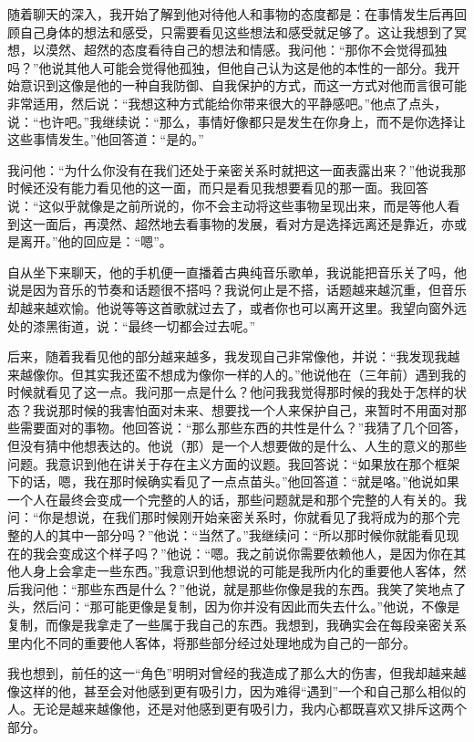 \tristarsepline

随着聊天的深入，我开始了解到他对待他人和事物的态度都是：在事情发生后再回顾自己身体的想法和感受，只需要看见这些想法和感受就足够了。这让我想到了冥想，以漠然、超然的态度看待自己的想法和情感。我问他：“那你不会觉得孤独吗？”他说其他人可能会觉得他孤独，但他自己认为这是他的本性的一部分。我开始意识到这像是他的一种自我防御、自我保护的方式，而这一方式对他而言很可能非常适用，然后说：“我想这种方式能给你带来很大的平静感吧。”他点了点头，说：“也许吧。”我继续说：“那么，事情好像都只是发生在你身上，而不是你选择让这些事情发生。”他回答道：“是的。”

我问他：“为什么你没有在我们还处于亲密关系时就把这一面表露出来？”他说我那时候还没有能力看见他的这一面，而只是看见我想要看见的那一面。我回答说：“这似乎就像是之前所说的，你不会主动将这些事物呈现出来，而是等他人看到这一面后，再漠然、超然地去看事物的发展，看对方是选择远离还是靠近，亦或是离开。”他的回应是：“嗯”。

自从坐下来聊天，他的手机便一直播着古典纯音乐歌单，我说能把音乐关了吗，他说是因为音乐的节奏和话题很不搭吗？我说何止是不搭，话题越来越沉重，但音乐却越来越欢愉。他说等等这首歌就过去了，或者你也可以离开这里。我望向窗外远处的漆黑街道，说：“最终一切都会过去呢。”

\tristarsepline

后来，随着我看见他的部分越来越多，我发现自己非常像他，并说：“我发现我越来越像你。但其实我还蛮不想成为像你一样的人的。”他说他在（三年前）遇到我的时候就看见了这一点。我问那一点是什么？他问我我觉得那时候的我处于怎样的状态？我说那时候的我害怕面对未来、想要找一个人来保护自己，来暂时不用面对那些需要面对的事物。他回答说：“那么那些东西的共性是什么？”我猜了几个回答，但没有猜中他想表达的。他说（那）是一个人想要做的是什么、人生的意义的那些问题。我意识到他在讲关于存在主义方面的议题。我回答说：“如果放在那个框架下的话，嗯，我在那时候确实看见了一点点苗头。”他回答道：“就是咯。”他说如果一个人在最终会变成一个完整的人的话，那些问题就是和那个完整的人有关的。我问：“你是想说，在我们那时候刚开始亲密关系时，你就看见了我将成为的那个完整的人的其中一部分吗？”他说：“当然了。”我继续问：“所以那时候你就能看见现在的我会变成这个样子吗？”他说：“嗯。我之前说你需要依赖他人，是因为你在其他人身上会拿走一些东西。”我意识到他想说的可能是我所内化的重要他人客体，然后我问他：“那些东西是什么？”他说，就是那些你像是我的东西。我笑了笑地点了头，然后问：“那可能更像是复制，因为你并没有因此而失去什么。”他说，不像是复制，而像是我拿走了一些属于我自己的东西。我想到，我确实会在每段亲密关系里内化不同的重要他人客体，将那些部分经过处理地成为自己的一部分。

我也想到，前任的这一“角色”明明对曾经的我造成了那么大的伤害，但我却越来越像这样的他，甚至会对他感到更有吸引力，因为难得“遇到”一个和自己那么相似的人。无论是越来越像他，还是对他感到更有吸引力，我内心都既喜欢又排斥这两个部分。


